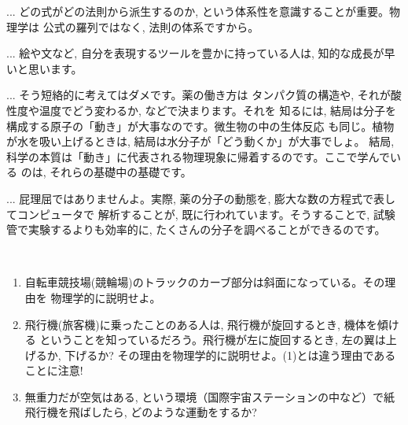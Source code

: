 \begin{faq}{\small{} ... 
どの式がどの法則から派生するのか, という体系性を意識することが重要。物理学は
公式の羅列ではなく, 法則の体系ですから。}\end{faq}\mv

\begin{faq}{\small{} ... 
絵や文など, 自分を表現するツールを豊かに持っている人は, 
知的な成長が早いと思います。}\end{faq}\mv

\begin{faq}{\small{} ... そう短絡的に考えてはダメです。薬の働き方は
タンパク質の構造や, それが酸性度や温度でどう変わるか, などで決まります。それを
知るには, 結局は分子を構成する原子の「動き」が大事なのです。微生物の中の生体反応
も同じ。植物が水を吸い上げるときは, 結局は水分子が「どう動くか」が大事でしょ。
結局, 科学の本質は「動き」に代表される物理現象に帰着するのです。ここで学んでいる
のは, それらの基礎中の基礎です。}\end{faq}\mv

\begin{faq}{\small{} ... 
屁理屈ではありませんよ。実際, 薬の分子の動態を, 膨大な数の方程式で表してコンピュータで
解析することが, 既に行われています。そうすることで, 試験管で実験するよりも効率的に, 
たくさんの分子を調べることができるのです。}\end{faq}\mv
\hv

\begin{exq}　
\begin{enumerate}
\item 自転車競技場(競輪場)のトラックのカーブ部分は斜面になっている。その理由を
物理学的に説明せよ。
\item 飛行機(旅客機)に乗ったことのある人は, 飛行機が旋回するとき, 機体を傾ける
ということを知っているだろう。飛行機が左に旋回するとき, 左の翼は上げるか, 下げるか?
その理由を物理学的に説明せよ。(1)とは違う理由であることに注意!
\item 無重力だが空気はある, という環境（国際宇宙ステーションの中など）で紙飛行機を飛ばしたら, どのような運動をするか?
\end{enumerate}
\end{exq}



